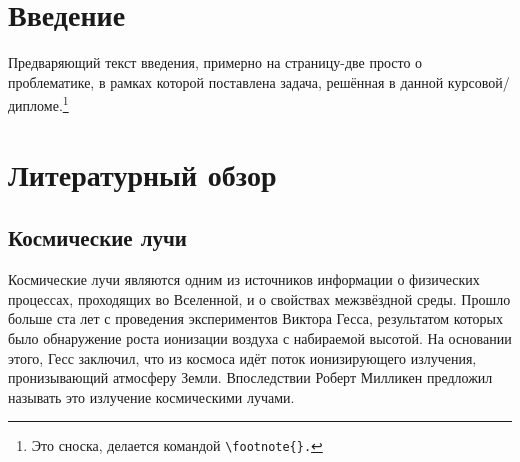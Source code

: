 \documentclass[magd,floatypics,numeref]{msudipl} %
\begin{document}
\author{Разумов Александр Юрьевич}
\maketitle


\tableofcontents   %

\chapter*{Введение}   %
Предваряющий текст введения, примерно на страницу-две просто о проблематике, в рамках которой поставлена задача, решённая в данной курсовой/дипломе.\footnote{Это сноска, делается командой \texttt{\textbackslash{}footnote\{\}.}}

\chapter{Литературный обзор}
\section{Космические лучи}
Космические лучи являются одним из источников информации о физических процессах, проходящих во Вселенной, и о свойствах межзвёздной среды. Прошло больше ста лет с проведения экспериментов Виктора Гесса, результатом которых было обнаружение роста ионизации воздуха с набираемой высотой. На основании этого, Гесс заключил, что из космоса идёт поток ионизирующего излучения, пронизывающий атмосферу Земли. Впоследствии Роберт Милликен предложил называть это излучение космическими лучами.
\end{document}
